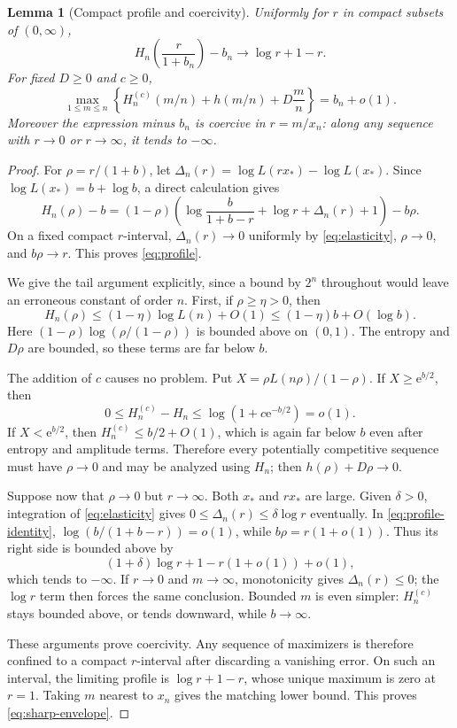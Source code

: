 \documentclass[11pt,a4paper]{article}
\numberwithin{equation}{section}
\newtheorem{lemma}[theorem]{Lemma}
\theoremstyle{definition}
\theoremstyle{remark}
\newcommand{\ee}{\mathrm e}
\begin{document}
\begin{lemma}[Compact profile and coercivity]
\label{lem:profile}
Uniformly for $r$ in compact subsets of $(0,\infty)$,
\begin{equation}
 H_n\!\left(\frac{r}{1+b_n}\right)-b_n
 \longrightarrow\log r+1-r.
 \label{eq:profile}
\end{equation}
For fixed $D\ge0$ and $c\ge0$,
\begin{equation}
 \max_{1\le m\le n}
 \left\{H_n^{(c)}(m/n)+h(m/n)+D\frac mn\right\}
 =b_n+o(1).
 \label{eq:sharp-envelope}
\end{equation}
Moreover the expression minus $b_n$ is coercive in
$r=m/x_n$: along any sequence with $r\to0$ or $r\to\infty$, it tends to
$-\infty$.
\end{lemma}
\begin{proof}
For $\rho=r/(1+b)$, let
$\Delta_n(r)=\log L(rx_*)-\log L(x_*)$.
Since $\log L(x_*)=b+\log b$, a direct calculation gives
\begin{equation}
 H_n(\rho)-b
 =(1-\rho)\left(
 \log\frac{b}{1+b-r}+\log r+\Delta_n(r)+1\right)-b\rho.
 \label{eq:profile-identity}
\end{equation}
On a fixed compact $r$-interval, $\Delta_n(r)\to0$ uniformly by
\eqref{eq:elasticity}, $\rho\to0$, and $b\rho\to r$.
This proves \eqref{eq:profile}.

We give the tail argument explicitly, since a bound by $2^n$ throughout
would leave an erroneous constant of order $n$.
First, if $\rho\ge\eta>0$, then
\[
 H_n(\rho)\le(1-\eta)\log L(n)+O(1)
              \le(1-\eta)b+O(\log b).
\]
Here $(1-\rho)\log(\rho/(1-\rho))$ is bounded above on $(0,1)$.
The entropy and $D\rho$ are bounded, so these terms are far below $b$.

The addition of $c$ causes no problem. Put
$X=\rho L(n\rho)/(1-\rho)$. If $X\ge\ee^{b/2}$, then
\[
 0\le H_n^{(c)}-H_n
 \le\log(1+c\ee^{-b/2})=o(1).
\]
If $X<\ee^{b/2}$, then $H_n^{(c)}\le b/2+O(1)$, which is again far
below $b$ even after entropy and amplitude terms. Therefore every
potentially competitive sequence must have $\rho\to0$ and may be
analyzed using $H_n$; then $h(\rho)+D\rho\to0$.

Suppose now that $\rho\to0$ but $r\to\infty$. Both $x_*$ and $rx_*$
are large. Given $\delta>0$, integration of \eqref{eq:elasticity} gives
$0\le\Delta_n(r)\le\delta\log r$ eventually. In
\eqref{eq:profile-identity},
$\log(b/(1+b-r))=o(1)$, while $b\rho=r(1+o(1))$.
Thus its right side is bounded above by
\[
 (1+\delta)\log r+1-r(1+o(1))+o(1),
\]
which tends to $-\infty$.
If $r\to0$ and $m\to\infty$, monotonicity gives $\Delta_n(r)\le0$;
the $\log r$ term then forces the same conclusion. Bounded $m$ is
even simpler: $H_n^{(c)}$ stays bounded above, or tends downward, while
$b\to\infty$.

These arguments prove coercivity. Any sequence of maximizers is therefore
confined to a compact $r$-interval after discarding a vanishing error.
On such an interval, the limiting profile is $\log r+1-r$, whose unique
maximum is zero at $r=1$. Taking $m$ nearest to $x_n$ gives the matching
lower bound. This proves \eqref{eq:sharp-envelope}.
\end{proof}
\end{document}

